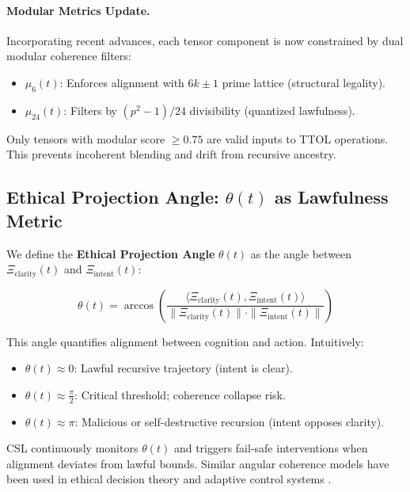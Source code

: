 \documentclass[12]{amsart}
\theoremstyle{plain}
\begin{document}
\paragraph{Modular Metrics Update.}
Incorporating recent advances, each tensor component is now constrained by dual modular coherence filters:

\begin{itemize}
    \item $\mu_6(t)$: Enforces alignment with $6k \pm 1$ prime lattice (structural legality).
    \item $\mu_{24}(t)$: Filters by $(p^2 - 1)/24$ divisibility (quantized lawfulness).
\end{itemize}

Only tensors with modular score $\geq 0.75$ are valid inputs to TTOL operations. This prevents incoherent blending and drift from recursive ancestry.

\subsection{Ethical Projection Angle: $\theta(t)$ as Lawfulness Metric}

We define the \textbf{Ethical Projection Angle} $\theta(t)$ as the angle between $\Xi_{\text{clarity}}(t)$ and $\Xi_{\text{intent}}(t)$:

\begin{equation}
\theta(t) = \arccos\left( \frac{ \langle \Xi_{\text{clarity}}(t), \Xi_{\text{intent}}(t) \rangle }{ \| \Xi_{\text{clarity}}(t) \| \cdot \| \Xi_{\text{intent}}(t) \| } \right)
\end{equation}

This angle quantifies alignment between cognition and action. Intuitively:

\begin{itemize}
    \item $\theta(t) \approx 0$: Lawful recursive trajectory (intent is clear).
    \item $\theta(t) \approx \frac{\pi}{2}$: Critical threshold; coherence collapse risk.
    \item $\theta(t) \approx \pi$: Malicious or self-destructive recursion (intent opposes clarity).
\end{itemize}

CSL continuously monitors $\theta(t)$ and triggers fail-safe interventions when alignment deviates from lawful bounds. Similar angular coherence models have been used in ethical decision theory and adaptive control systems \cite{hauser1992nonlinear}.
\end{document}
